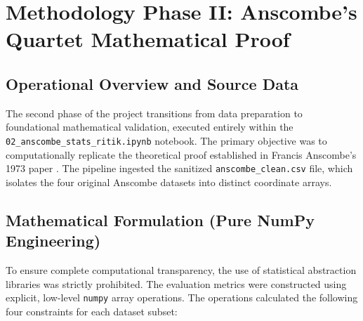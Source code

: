 \documentclass[12pt, a4paper]{article}
\begin{document}
\newpage
\section{Methodology Phase II: Anscombe's Quartet Mathematical Proof}
\subsection{Operational Overview and Source Data}
The second phase of the project transitions from data preparation to foundational mathematical validation, executed entirely within the \texttt{02\_anscombe\_stats\_ritik.ipynb} notebook. The primary objective was to computationally replicate the theoretical proof established in Francis Anscombe's 1973 paper \cite{anscombe1973}. The pipeline ingested the sanitized \texttt{anscombe\_clean.csv} file, which isolates the four original Anscombe datasets into distinct coordinate arrays. 

\subsection{Mathematical Formulation (Pure NumPy Engineering)}
To ensure complete computational transparency, the use of statistical abstraction libraries was strictly prohibited. The evaluation metrics were constructed using explicit, low-level \texttt{numpy} array operations. The operations calculated the following four constraints for each dataset subset:
\end{document}
